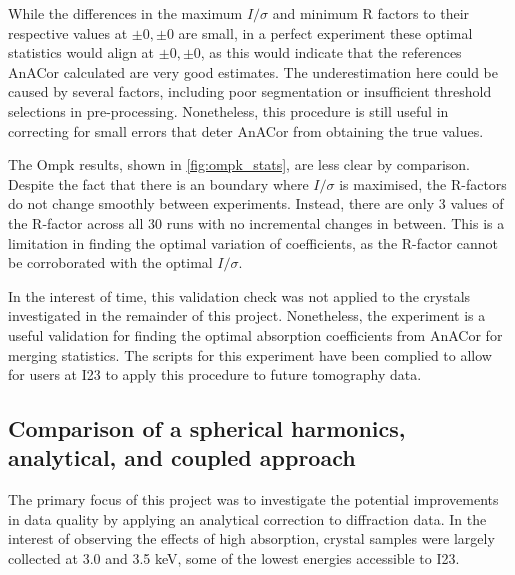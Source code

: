 While the differences in the maximum $I/\sigma$ and minimum R factors to their respective values at $\pm0,\pm0$ are small, in a perfect experiment these optimal statistics would align at $\pm0,\pm0$, as this would indicate that the references AnACor calculated are very good estimates. The underestimation here could be caused by several factors, including poor segmentation or insufficient threshold selections in pre-processing. Nonetheless, this procedure is still useful in correcting for small errors that deter AnACor from obtaining the true values. 

The Ompk results, shown in \cref{fig:ompk_stats}, are less clear by comparison. Despite the fact that there is an boundary where $I/\sigma$ is maximised, the R-factors do not change smoothly between experiments. Instead, there are only 3 values of the R-factor across all 30 runs with no incremental changes in between. This is a limitation in finding the optimal variation of coefficients, as the R-factor cannot be corroborated with the optimal $I/\sigma$.




In the interest of time, this validation check was not applied to the crystals investigated in the remainder of this project. Nonetheless, the experiment is a useful validation for finding the optimal absorption coefficients from AnACor for merging statistics. The scripts for this experiment have been complied to allow for users at I23 to apply this procedure to future tomography data. %


\subsection{Comparison of a spherical harmonics, analytical, and coupled approach} %
The primary focus of this project was to investigate the potential improvements in data quality by applying an analytical correction to diffraction data.
In the interest of observing the effects of high absorption, crystal samples were largely collected at 3.0 and 3.5 keV, some of the lowest energies accessible to I23.

